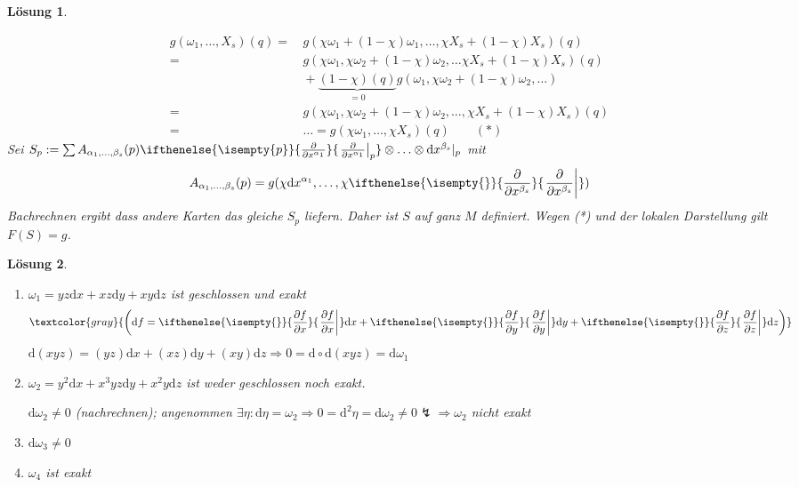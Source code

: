 \documentclass[paper=A4, twoside, chapterprefix=true, bibliography=totoc, headsepline]{scrbook}
\newcommand{\dop}{\mathrm{d}}
\newcommand{\pdifffrac}[3][]{\ifthenelse{\isempty{#1}}{\frac{\partial #2}{\partial #3}}{\left. \frac{\partial #2}{\partial #3} \right|_{#1}}}
\theoremstyle{plain}
\theoremstyle{nonumberplain}
\theoremstyle{empty}
\theoremstyle{break}
\newtheorem{Loes}{L\"osung}
\begin{document}
\begin{Loes}
\begin{description}[leftmargin=*]
	\begin{align*}
		g(\omega_1, \ldots ,X_s)(q) ={}&\, g(\chi\omega_1 + (1-\chi)\omega_1,\ldots ,\chi X_s + (1 - \chi) X_s)(q)\\
		={}&\, g(\chi \omega_1, \chi \omega_2 + (1 - \chi) \omega_2, \ldots \chi X_s + (1-\chi) X_s)(q)\\
		 &\, + \underbrace{(1-\chi)(q)}_{=0} g(\omega_1, \chi \omega_2 + (1-\chi) \omega_2,\ldots )\\
		={}&\, g(\chi\omega_1, \chi\omega_2 + (1-\chi)\omega_2,\ldots ,\chi X_s+ (1-\chi) X_s)(q)\\
		={}&\, \ldots = g(\chi \omega_1, \ldots ,\chi X_s)(q) \qquad (*)
	\end{align*}
	Sei $S_p := \sum A_{\alpha_1, \ldots, \beta_s}(p) \pdifffrac[p]{}{x^{\alpha_1}} \otimes \ldots \otimes \dop x^{\beta_s}|_p$ mit
		\[ A_{\alpha_1, \ldots, \beta_s}(p) = g(\chi \dop x^{\alpha_1},\ldots ,\chi \pdifffrac{}{x^{\beta_s}}) \]
	Bachrechnen ergibt dass andere Karten das gleiche $S_p$ liefern. Daher ist $S$ auf ganz $M$ definiert. Wegen (*) und der lokalen Darstellung gilt $F(S) = g$.
\end{description}
\end{Loes}

\begin{Loes}\begin{enumerate}[label=\alph*), leftmargin=*]
\item
	$\omega_1 = yz \dop x + xz \dop y + xy \dop z$ ist geschlossen und exakt
		\[ \textcolor{gray}{\left(\dop f = \pdifffrac{f}{x} \dop x + \pdifffrac{f}{y} \dop y + \pdifffrac{f}{z} \dop z \right)} \]
	$\dop(xyz) = (yz) \dop x + (xz) \dop y + (xy) \dop z \Rightarrow 0 = \dop \circ \dop(xyz) = \dop \omega_1$
\item
	$\omega_2 = y^2 \dop x + x^3yz \dop y + x^2y \dop z$ ist weder geschlossen noch exakt.
	
	$\dop \omega_2 \ne 0$ (nachrechnen); angenommen $\exists \eta : \dop \eta = \omega_2 \Rightarrow 0 = \dop^2 \eta = \dop \omega_2 \ne 0 \lightning \Rightarrow \omega_2$ nicht exakt
\item
	$\dop \omega_3 \ne 0$
\item
	$\omega_4$ ist exakt
\end{enumerate}\end{Loes}
\end{document}
